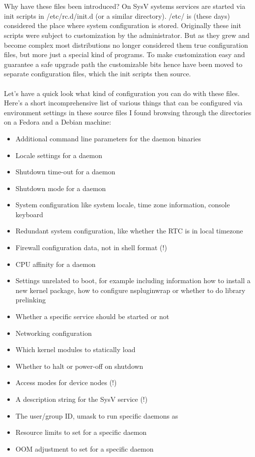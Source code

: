 \documentclass[titlepage]{article}
\begin{document}
\\
\\
Why have these files been introduced? On SysV systems services are started via init scripts in /etc/rc.d/init.d (or a similar directory). /etc/ is (these days) considered the place where system configuration is stored. Originally these init scripts were subject to customization by the administrator. But as they grew and become complex most distributions no longer considered them true configuration files, but more just a special kind of programs. To make customization easy and guarantee a safe upgrade path the customizable bits hence have been moved to separate configuration files, which the init scripts then source.
\\
\\
Let's have a quick look what kind of configuration you can do with these files. Here's a short incomprehensive list of various things that can be configured via environment settings in these source files I found browsing through the directories on a Fedora and a Debian machine:
\begin{itemize}
\item Additional command line parameters for the daemon binaries
\item Locale settings for a daemon
\item Shutdown time-out for a daemon
\item Shutdown mode for a daemon
\item System configuration like system locale, time zone information, console keyboard
\item Redundant system configuration, like whether the RTC is in local timezone
\item Firewall configuration data, not in shell format (!)
\item CPU affinity for a daemon
\item Settings unrelated to boot, for example including information how to install a new kernel package, how to configure nspluginwrap or whether to do library prelinking
\item Whether a specific service should be started or not
\item Networking configuration
\item Which kernel modules to statically load
\item Whether to halt or power-off on shutdown
\item Access modes for device nodes (!)
\item A description string for the SysV service (!)
\item The user/group ID, umask to run specific daemons as
\item Resource limits to set for a specific daemon
\item OOM adjustment to set for a specific daemon
\end{itemize}
\end{document}
